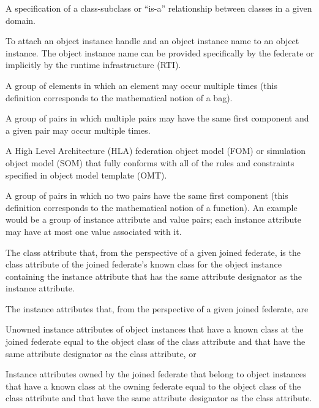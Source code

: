  A specification of a class-subclass or ``is-a'' relationship between classes in a given domain.

 To attach an object instance handle and an object instance name to an object instance. The object instance name can be provided specifically by the federate or implicitly by the runtime infrastructure (RTI).

 A group of elements in which an element may occur multiple times (this definition corresponds to the mathematical notion of a bag).

 A group of pairs in which multiple pairs may have the same first component and a given pair may occur multiple times.

 A High Level Architecture (HLA) federation object model (FOM) or simulation object model (SOM) that fully conforms with all of the rules and constraints specified in object model template (OMT).

 A group of pairs in which no two pairs have the same first component (this definition corresponds to the mathematical notion of a function). An example would be a group of instance attribute and value pairs; each instance attribute may have at most one value associated with it.

 The class attribute that, from the perspective of a given joined federate, is the class attribute of the joined federate's known class for the object instance containing the instance attribute that has the same attribute designator as the instance attribute.

 The instance attributes that, from the perspective of a given joined federate, are
\begin{stdalphalist}
    \item Unowned instance attributes of object instances that have a known class at the joined federate equal to the object class of the class attribute and that have the same attribute designator as the class attribute, or
    \item Instance attributes owned by the joined federate that belong to object instances that have a known class at the owning federate equal to the object class of the class attribute and that have the same attribute designator as the class attribute.
\end{stdalphalist}


